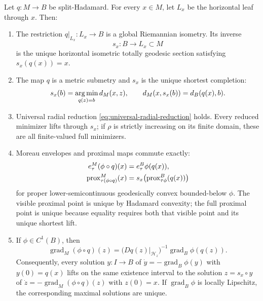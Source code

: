 \begin{theorem}
\label{thm:split-hadamard}
Let \(q:M\to B\) be split-Hadamard.  For every \(x\in M\), let \(L_x\) be
the horizontal leaf through \(x\).  Then:
\begin{enumerate}[label=(\roman*),leftmargin=*]
  \item The restriction \(q|_{L_x}:L_x\to B\) is a global Riemannian
  isometry.  Its inverse
  \[
    s_x:B\to L_x\subset M
  \]
  is the unique horizontal isometric totally geodesic section satisfying
  \(s_x(q(x))=x\).
  \item The map \(q\) is a metric submetry and \(s_x\) is the unique shortest
  completion:
  \begin{equation}
    s_x(b)=\operatorname*{arg\,min}_{q(z)=b}d_M(x,z),
    \qquad
    d_M(x,s_x(b))=d_B(q(x),b).
    \label{eq:split-shortest-lift}
  \end{equation}
  \item Universal radial reduction \eqref{eq:universal-radial-reduction}
  holds.  Every reduced minimizer lifts through \(s_x\); if \(\rho\) is
  strictly increasing on its finite domain, these are all finite-valued full
  minimizers.
  \item Moreau envelopes and proximal maps commute exactly:
  \begin{align}
    e_\tau^M(\phi\circ q)(x)&=e_\tau^B\phi(q(x)),
    \label{eq:split-moreau}\\
    \operatorname{prox}^M_{\tau(\phi\circ q)}(x)
    &=s_x\!\left(\operatorname{prox}^B_{\tau\phi}(q(x))\right)
    \label{eq:split-prox}
  \end{align}
  for proper lower-semicontinuous geodesically convex bounded-below
  \(\phi\).  The visible proximal point is unique by Hadamard convexity; the
  full proximal point is unique because equality requires both that visible
  point and its unique shortest lift.
  \item If \(\phi\in C^1(B)\), then
  \begin{equation}
    \operatorname{grad}_M(\phi\circ q)(z)
    =
    \bigl(Dq(z)|_{\mathcal H_z}\bigr)^{-1}
    \operatorname{grad}_B\phi(q(z)).
    \label{eq:split-gradient}
  \end{equation}
  Consequently, every solution \(y:I\to B\) of
  \(\dot y=-\operatorname{grad}_B\phi(y)\) with \(y(0)=q(x)\) lifts on the
  same existence interval to the solution
  \(z=s_x\circ y\) of
  \(\dot z=-\operatorname{grad}_M(\phi\circ q)(z)\) with \(z(0)=x\).
  If \(\operatorname{grad}_B\phi\) is locally Lipschitz, the corresponding
  maximal solutions are unique.
\end{enumerate}
\end{theorem}

